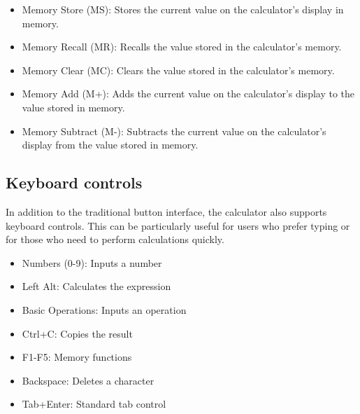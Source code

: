 \begin{itemize}
	\item Memory Store (MS): Stores the current value on the calculator's display in memory.
	\item Memory Recall (MR): Recalls the value stored in the calculator's memory.
	\item Memory Clear (MC): Clears the value stored in the calculator's memory.
	\item Memory Add (M+): Adds the current value on the calculator's display to the value stored in memory.
	\item Memory Subtract (M-): Subtracts the current value on the calculator's display from the value stored in memory.
\end{itemize}

\subsection{Keyboard controls}
In addition to the traditional button interface, the calculator also supports keyboard controls. This can be particularly useful for users who prefer typing or for those who need to perform calculations quickly.

\begin{itemize}
	\item Numbers (0-9): Inputs a number
	\item Left Alt: Calculates the expression
	\item Basic Operations: Inputs an operation
	\item Ctrl+C: Copies the result
	\item F1-F5: Memory functions
	\item Backspace: Deletes a character
	\item Tab+Enter: Standard tab control
\end{itemize}
